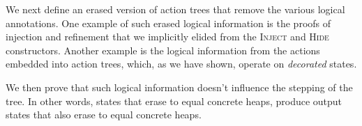 

We next define an erased version of action trees that remove the
various logical annotations. One example of such erased logical
information is the proofs of injection and refinement that we
implicitly elided from the \textsc{Inject} and \textsc{Hide}
constructors. Another example is the logical information from the
actions embedded into action trees, which, as we have shown, operate
on \emph{decorated} states. 

We then prove that such logical information doesn't influence the
stepping of the tree. In other words, states that erase to equal
concrete heaps, produce output states that also erase to equal
concrete heaps.

